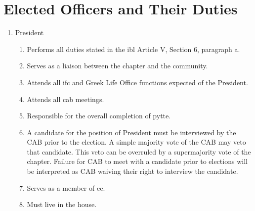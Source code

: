 \section{Elected Officers and Their Duties}
	\begin{enumerate}
		\item President
			\begin{enumerate}
				\item Performs all duties stated in the \gls{ibl} Article V, Section 6, paragraph a.
				\item Serves as a liaison between the chapter and the community.
				\item Attends all \gls{ifc} and Greek Life Office functions expected of the President.
				\item Attends all \gls{cab} meetings.
				\item Responsible for the overall completion of \gls{pytte}.
                \item A candidate for the position of President must be interviewed by the CAB prior to the
election. A simple majority vote of the CAB may veto that candidate. This veto can be overruled
by a supermajority vote of the chapter. Failure for CAB to meet with a candidate prior to
elections will be interpreted as CAB waiving their right to interview the candidate.
				\item Serves as a member of \gls{ec}.
				\item Must live in the house.
			\end{enumerate}
		

\end{enumerate}
